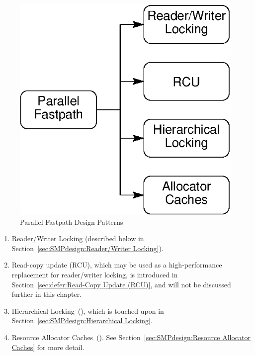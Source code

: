 \begin{figure}[htb]
\begin{center}
\includegraphics{SMPdesign/ParallelFastpath}
\end{center}
\caption{Parallel-Fastpath Design Patterns}
\label{fig:SMPdesign:Parallel-Fastpath Design Patterns}
\end{figure}

\begin{enumerate}
\item	Reader/Writer Locking
	(described below in Section~\ref{sec:SMPdesign:Reader/Writer Locking}).
\item	Read-copy update (RCU), which may be used as a high-performance
	replacement for reader/writer locking, is introduced in
	Section~\ref{sec:defer:Read-Copy Update (RCU)}, and will not
	be discussed further in this chapter.
\item   Hierarchical Locking~(\cite{McKenney95b}), which is touched upon
	in Section~\ref{sec:SMPdesign:Hierarchical Locking}.
\item	Resource Allocator Caches~(\cite{McKenney95b,McKenney93}).
	See Section~\ref{sec:SMPdesign:Resource Allocator Caches}
	for more detail.
\end{enumerate}

